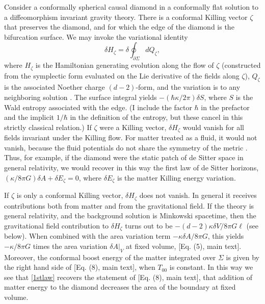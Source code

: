 \documentclass[aps,prd,twocolumn,showpacs,groupedaddress,nofootinbib,longbibliography]{revtex4-1}
\def\beq{\begin{equation}}
\def\eeq{\end{equation}}
\def\d{\delta}\def\D{\Delta}
\def\z{\zeta}
\def\k{\kappa}
\begin{document}
Consider a conformally spherical causal diamond in a conformally flat solution to 
a diffeomorphism invariant gravity theory. 
There is a conformal Killing vector $\z$ that preserves the diamond, and for which the edge of the diamond is the bifurcation surface. We may invoke the variational identity 
%
\beq\label{1stlaw}
\d H_\z = \d \oint_{\partial\Sigma} dQ_\z,
\eeq
%
where $H_\z$ is the Hamiltonian generating evolution along the flow of $\z$ (constructed from the symplectic form evaluated on the Lie derivative of the fields along $\z$), $Q_\z$ is the associated
Noether charge $(d-2)$-form, and the variation is to any neighboring solution \cite{Iyer:1994ys}. 
The surface integral yields $-(\hbar\k/2\pi) \d S$, where $S$ is the Wald entropy associated with 
 the edge. 
(I include the factor $\hbar$ in the prefactor and the implicit $1/\hbar$ in the definition of the entropy, 
but these cancel in this strictly classical relation.)
If $\z$ were a Killing vector, $\d H_\z$ would vanish for all fields invariant under the Killing flow.
For matter treated as a fluid, it would not vanish, because the fluid potentials do not share the symmetry of the metric \cite{Iyer:1996ky,Green:2013ica}. Thus, for example, if the diamond were the static patch of de Sitter space in general relativity, we would recover in this way the first law of de Sitter horizons,
$(\k/8\pi G)\d A + \d E_\z=0$, where $\d E_\z$ is the matter Killing energy variation.

If $\z$ is only a conformal Killing vector,  $\d H_\z$ does not vanish. 
In general it receives contributions both from matter and from the gravitational field. 
If the theory is general relativity, and 
the background solution is Minkowski spacetime, then the gravitational field contribution to $\d H_\z$  
turns out to be $-(d-2)\k\d V/8\pi G\ell$ (see below).
When combined with the area variation term $-\k\d A/8\pi G$, this yields $-\k/8\pi G$ times 
the area variation $\d A|_V$ at fixed volume, [Eq. (5), main text].
Moreover, the conformal boost energy of the matter integrated over $\Sigma$ is given by the right hand side of %
[Eq. (8), main text],
when $T_{00}$ is constant. In this way we see that \eqref{1stlaw} recovers the statement of 
[Eq. (8), main text],
that addition of matter energy to the diamond decreases the area of the boundary at fixed volume.
\end{document}
